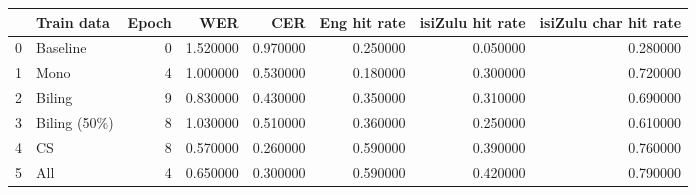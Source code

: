 \begin{tabular}{llrrrrrr}
\toprule
 & Train data & Epoch & WER & CER & Eng hit rate & isiZulu hit rate & isiZulu char hit rate \\
\midrule
0 & Baseline & 0 & 1.520000 & 0.970000 & 0.250000 & 0.050000 & 0.280000 \\
1 & Mono & 4 & 1.000000 & 0.530000 & 0.180000 & 0.300000 & 0.720000 \\
2 & Biling & 9 & 0.830000 & 0.430000 & 0.350000 & 0.310000 & 0.690000 \\
3 & Biling (50\%) & 8 & 1.030000 & 0.510000 & 0.360000 & 0.250000 & 0.610000 \\
4 & CS & 8 & 0.570000 & 0.260000 & 0.590000 & 0.390000 & 0.760000 \\
5 & All & 4 & 0.650000 & 0.300000 & 0.590000 & 0.420000 & 0.790000 \\
\bottomrule
\end{tabular}
